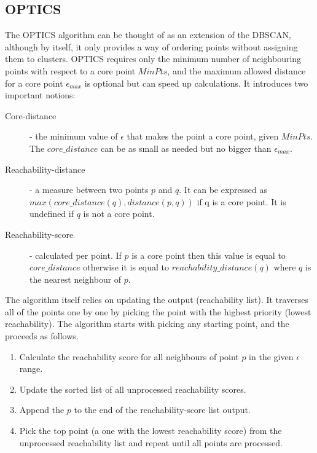 \subsection{OPTICS}

The OPTICS \cite{10.1145/304182.304187, rhys2020machine} algorithm can be thought of as an extension of the DBSCAN, although by itself, it only provides a way of ordering points without assigning them to clusters.
OPTICS requires only the minimum number of neighbouring points with respect to a core point $MinPts$, and the maximum allowed distance for a core point $\epsilon_{max}$ is optional but can speed up calculations.
It introduces two important notions:

\begin{description}
   \item[Core-distance] - the minimum value of $\epsilon$ that makes the point a core point, given $MinPts$. The $core\_distance$ can be as small as needed but no bigger than $\epsilon_{max}$.
   \item[Reachability-distance] - a measure between two points $p$ and $q$. It can be expressed as \\ $max(core\_distance(q), distance(p,q))$ if q is a core point. It is undefined if $q$ is not a core point.
  \item[Reachability-score] - calculated per point. If $p$ is a core point then this value is equal to $core\_distance$ otherwise it is equal to $reachability\_distance(q)$ where $q$ is the nearest neighbour of $p$.
\end{description}

The algorithm itself relies on updating the output (reachability list). It traverses all of the points one by one by picking the point with the highest priority (lowest reachability). The algorithm starts with picking any starting point, and the proceeds as follows.

\begin{enumerate}
\item Calculate the reachability score for all neighbours of point $p$ in the given $\epsilon$ range.
\item Update the sorted list of all unprocessed reachability scores.
\item Append the $p$ to the end of the reachability-score list output.
\item Pick the top point (a one with the lowest reachability score) from the unprocessed reachability list and repeat until all points are processed.
\end{enumerate}

